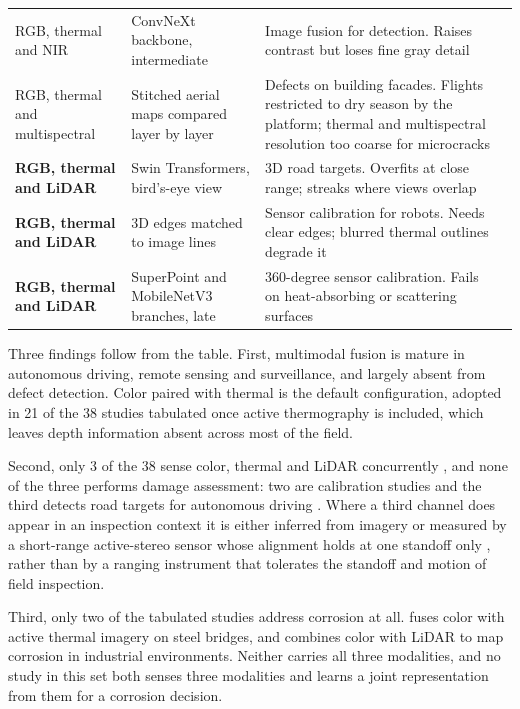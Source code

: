 \begin{xltabular}{\textwidth}{@{}p{2.5cm} X X l@{}}
RGB, thermal and NIR & ConvNeXt backbone, intermediate & Image fusion for detection. Raises contrast but loses fine gray detail & \citep{Laidouni2025} \\
RGB, thermal and multispectral & Stitched aerial maps compared layer by layer & Defects on building facades. Flights restricted to dry season by the platform; thermal and multispectral resolution too coarse for microcracks & \citep{Guedes2025} \\
\textbf{RGB, thermal and LiDAR} & Swin Transformers, bird's-eye view & 3D road targets. Overfits at close range; streaks where views overlap & \citep{Tran2025} \\
\textbf{RGB, thermal and LiDAR} & 3D edges matched to image lines & Sensor calibration for robots. Needs clear edges; blurred thermal outlines degrade it & \citep{Yang2024} \\
\textbf{RGB, thermal and LiDAR} & SuperPoint and MobileNetV3 branches, late & 360-degree sensor calibration. Fails on heat-absorbing or scattering surfaces & \citep{Tran2024} \\
\end{xltabular}
\endgroup

Three findings follow from the table. First, multimodal fusion is mature in
autonomous driving, remote sensing and surveillance, and largely absent from
defect detection. Color paired with thermal is the default configuration,
adopted in 21 of the 38 studies tabulated once active thermography is included,
which leaves depth information absent across most of the field.

Second, only 3 of the 38 sense color, thermal and LiDAR concurrently
\citep{Tran2025,Yang2024,Tran2024}, and none of the three performs damage assessment: two are
calibration studies \citep{Yang2024,Tran2024} and the third detects road targets for
autonomous driving \citep{Tran2025}. Where a third channel does appear in an
inspection context it is either inferred from imagery \citep{Cao2026} or
measured by a short-range active-stereo sensor whose alignment holds at one
standoff only \citep{Nooralishahi2022}, rather than by a ranging instrument
that tolerates the standoff and motion of field inspection.

Third, only two of the tabulated studies address corrosion at all.
\citet{Lim2021} fuses color with active thermal imagery on steel bridges, and
\citet{PimenteldeFigueiredo2025} combines color with LiDAR to map corrosion in industrial
environments. Neither carries all three modalities, and no study in this set
both senses three modalities and learns a joint representation from them for a
corrosion decision.

